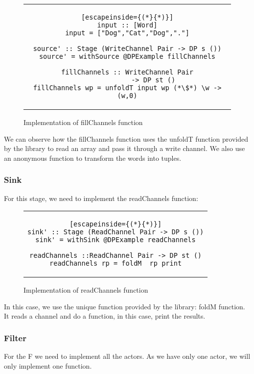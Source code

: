 \begin{figure}[H]
    \begin{tabular}{c}
        \begin{lstlisting}[escapeinside={(*}{*)}]
input :: [Word]
input = ["Dog","Cat","Dog","."]

source' :: Stage (WriteChannel Pair -> DP s ())
source' = withSource @DPExample fillChannels

fillChannels :: WriteChannel Pair
             -> DP st ()
fillChannels wp = unfoldT input wp (*\$*) \w -> (w,0)
        \end{lstlisting}
    \end{tabular}
    \caption{Implementation of fillChannels function}
    \label{fig:HC17}
\end{figure}

We can observe how the fillChannels function uses the unfoldT function provided by the library to read an array and pass it through a write channel.
We also use an anonymous function to transform the words into tuples.

\subsubsection*{Sink}
For this stage, we need to implement the readChannels function:

\begin{figure}[H]
    \begin{tabular}{c}
        \begin{lstlisting}[escapeinside={(*}{*)}]
sink' :: Stage (ReadChannel Pair -> DP s ())
sink' = withSink @DPExample readChannels

readChannels ::ReadChannel Pair -> DP st ()
readChannels rp = foldM_ rp print
        \end{lstlisting}
    \end{tabular}
    \caption{Implementation of readChannels function}
    \label{fig:HC18}
\end{figure}

In this case, we use the unique function provided by the library: foldM function.
It reads a channel and do a function, in this case, print the results.

\subsubsection*{Filter}
For the F we need to implement all the actors.
As we have only one actor, we will only implement one function.

